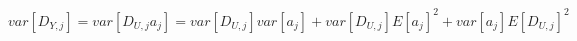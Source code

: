 \begin{equation}
var[D_{Y,j}] = var[D_{U,j}a_j] = var[D_{U,j}]var[a_j]+var[D_{U,j}]E[a_j]^2+var[a_j]E[D_{U,j}]^2
\end{equation}